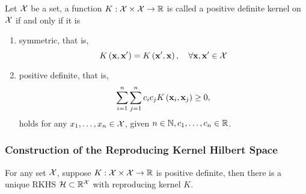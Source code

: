\begin{definition}
	Let \(\mathcal{X}\) be a set, a function \(K:\mathcal{X}\times\mathcal{X}\rightarrow\mathbb{R}\) is called a positive definite kernel on \(\mathcal{X}\) if and only if it is
	\begin{enumerate}
		\item symmetric, that is,
		      \begin{equation}
			      K\left(\mathbf{x},\mathbf{x}^{\prime}\right)=K\left(\mathbf{x}^{\prime},\mathbf{x}\right),\quad\forall\mathbf{x},\mathbf{x}^{\prime}\in\mathcal{X}
		      \end{equation}
		\item positive definite, that is,
		      \begin{equation}
			      \sum_{i=1}^{n}\sum_{j=1}^{n}c_{i}c_{j}K\left(\mathbf{x}_{i},\mathbf{x}_{j}\right)\geq 0,
		      \end{equation}
		      holds for any \(x_{1},\ldots,x_{n}\in\mathcal{X}\), given \(n\in\mathbb{N},c_{1},\ldots,c_{n}\in\mathbb{R}\).
	\end{enumerate}
\end{definition}

\subsubsection{Construction of the Reproducing Kernel Hilbert Space}

\begin{theorem}\label{thm:morse-aronszajn}
	For any set \(\mathcal{X}\), suppose \(K:\mathcal{X}\times\mathcal{X}\rightarrow\mathbb{R}\) is positive definite, then there is a unique RKHS \(\mathcal{H}\subset\mathbb{R}^{\mathcal{X}}\) with reproducing kernel \(K\).
\end{theorem}

